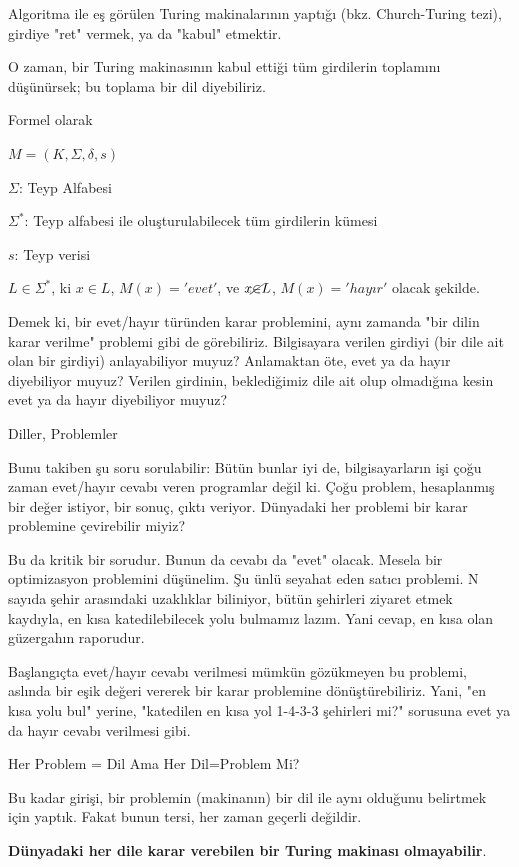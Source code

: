 \documentclass[12pt,fleqn]{article}\usepackage{../../common}
\begin{document}
Algoritma ile eş görülen Turing makinalarının yaptığı (bkz. Church-Turing
tezi), girdiye "ret" vermek, ya da "kabul" etmektir.

O zaman, bir Turing makinasının kabul ettiği tüm girdilerin toplamını
düşünürsek; bu toplama bir dil diyebiliriz.

Formel olarak

$M = (K,\Sigma,\delta,s)$

$\Sigma$: Teyp Alfabesi

$\Sigma^*$: Teyp alfabesi ile oluşturulabilecek tüm girdilerin kümesi

$s$: Teyp verisi

$L \in \Sigma^*$, ki $x \in L$, $M(x)='evet'$, ve $x \cancel{\in} L$,
$M(x)='hayır'$ olacak şekilde.

Demek ki, bir evet/hayır türünden karar problemini, aynı zamanda "bir dilin
karar verilme" problemi gibi de görebiliriz. Bilgisayara verilen girdiyi
(bir dile ait olan bir girdiyi) anlayabiliyor muyuz? Anlamaktan öte, evet
ya da hayır diyebiliyor muyuz? Verilen girdinin, beklediğimiz dile ait olup
olmadığına kesin evet ya da hayır diyebiliyor muyuz?

Diller, Problemler

Bunu takiben şu soru sorulabilir: Bütün bunlar iyi de, bilgisayarların işi
çoğu zaman evet/hayır cevabı veren programlar değil ki. Çoğu problem,
hesaplanmış bir değer istiyor, bir sonuç, çıktı veriyor. Dünyadaki her
problemi bir karar problemine çevirebilir miyiz?

Bu da kritik bir sorudur. Bunun da cevabı da "evet" olacak. Mesela bir
optimizasyon problemini düşünelim. Şu ünlü seyahat eden satıcı problemi. N
sayıda şehir arasındaki uzaklıklar biliniyor, bütün şehirleri ziyaret etmek
kaydıyla, en kısa katedilebilecek yolu bulmamız lazım. Yani cevap, en kısa
olan güzergahın raporudur.

Başlangıçta evet/hayır cevabı verilmesi mümkün gözükmeyen bu problemi,
aslında bir eşik değeri vererek bir karar problemine
dönüştürebiliriz. Yani, "en kısa yolu bul" yerine, "katedilen en kısa yol
1-4-3-3 şehirleri mi?" sorusuna evet ya da hayır cevabı verilmesi gibi.

Her Problem = Dil Ama Her Dil=Problem Mi?

Bu kadar girişi, bir problemin (makinanın) bir dil ile aynı olduğunu
belirtmek için yaptık. Fakat bunun tersi, her zaman geçerli değildir.

\textbf{Dünyadaki her dile karar verebilen bir Turing makinası olmayabilir}.
\end{document}
